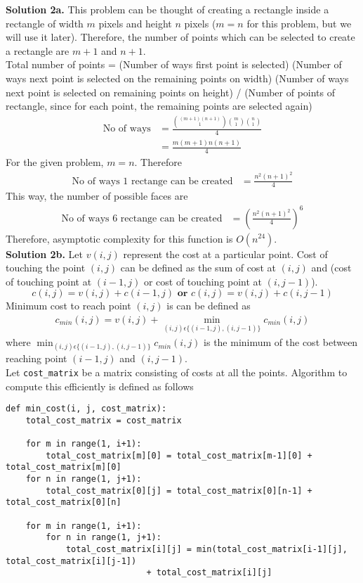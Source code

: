 \documentclass[11pt]{article}
\begin{document}
\textbf{Solution 2a.} This problem can be thought of creating a rectangle inside a rectangle of width $m$ pixels and height $n$ pixels ($m = n$ for this problem, but we will use it later). Therefore, the number of points which can be selected to create a rectangle are $m+1$ and $n+1$. \\
\linebreak
Total number of points  = (Number of ways first point is selected) (Number of ways next point is selected on the remaining points on width) (Number of ways next point is selected on remaining points on height) / (Number of points of rectangle, since for each point, the remaining points are selected again)
\begin{align*}
\text{No of ways} &= \frac{{(m+1)(n+1)\choose 1} {m\choose 1}{n\choose 1}}{4} \\
&= \frac{m(m+1)n(n+1)}{4}
\end{align*}
For the given problem, $m = n$. Therefore
\begin{align*}
\text{No of ways 1 rectange can be created} &= \frac{n^2(n+1)^2}{4}
\end{align*}
This way, the number of possible faces are \\
\begin{align*}
\text{No of ways 6 rectange can be created} &= (\frac{n^2(n+1)^2}{4})^6
\end{align*}
Therefore, asymptotic complexity for this function is $O(n^{24})$. \\
\linebreak
\textbf{Solution 2b.} Let $v(i, j)$ represent the cost at a particular point. Cost of touching the point $(i, j)$ can be defined as the sum of cost at $(i, j)$ and (cost of touching point at $(i-1, j)$ or cost of touching point at $(i, j-1)$). $$c(i, j) = v(i, j) + c(i-1, j) \textbf{ or } c(i, j) = v(i,j) + c(i, j-1)$$
Minimum cost to reach point $(i, j)$ is can be defined as \\
\begin{align*}
c_{min}(i, j) = v(i, j) + \min_{(i, j) \epsilon \{(i-1, j), (i, j-1)\}}c_{min}(i, j)
\end{align*}
where $\min_{(i, j) \epsilon \{(i-1, j), (i, j-1)\}}c_{min}(i, j)$ is the minimum of the cost between reaching point $(i-1, j)$ and $(i, j-1)$. \\
Let \lstinline{cost_matrix} be a matrix consisting of costs at all the points. Algorithm to compute this efficiently is defined as follows\\
\begin{lstlisting}[basicstyle=\small]
def min_cost(i, j, cost_matrix):
	total_cost_matrix = cost_matrix
	
	for m in range(1, i+1):
		total_cost_matrix[m][0] = total_cost_matrix[m-1][0] + total_cost_matrix[m][0]
	for n in range(1, j+1):
		total_cost_matrix[0][j] = total_cost_matrix[0][n-1] + total_cost_matrix[0][n]
		
	for m in range(1, i+1):
		for n in range(1, j+1):
			total_cost_matrix[i][j] = min(total_cost_matrix[i-1][j], total_cost_matrix[i][j-1]) 
							+ total_cost_matrix[i][j]
\end{lstlisting}
\end{document}
